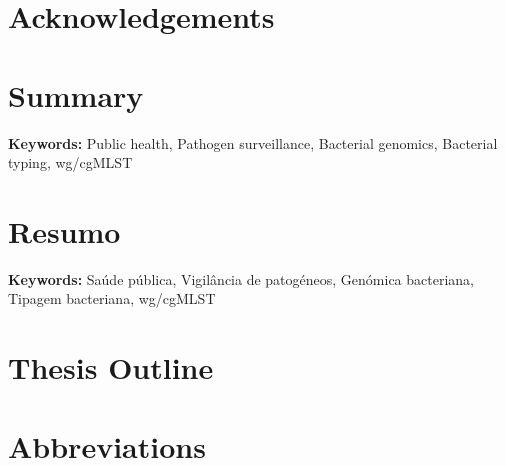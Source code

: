 \documentclass[12pt,a4paper,twoside,openright]{book}
\makeatletter
\def\cleardoublepage{\clearpage\if@twoside \ifodd\c@page\else
    \hbox{}
    \thispagestyle{plain}
    \newpage
    \if@twocolumn\hbox{}\newpage\fi\fi\fi}
\providecommand{\keywords}[1]{\textbf{Keywords:} #1}
\makeatother
\begin{document}
\begin{sloppy}
\chapter*{Acknowledgements}

\clearpage \thispagestyle{empty}\mbox{}\clearpage
\cleardoublepage

\newpage
\thispagestyle{plain}
\chapter*{Summary}


\keywords{Public health, Pathogen surveillance, Bacterial genomics, Bacterial typing, wg/cgMLST}
\clearpage \thispagestyle{empty}\mbox{}\clearpage
\cleardoublepage

\newpage
\thispagestyle{plain}
\chapter*{Resumo}


\keywords{Saúde pública, Vigilância de patogéneos, Genómica bacteriana, Tipagem bacteriana, wg/cgMLST}
\clearpage \thispagestyle{empty}\mbox{}\clearpage
\cleardoublepage

\newpage
\thispagestyle{plain}
\chapter*{Thesis Outline}

\clearpage \thispagestyle{empty}\mbox{}\clearpage
\cleardoublepage

\newpage
\thispagestyle{plain}
\chapter*{Abbreviations}

\clearpage \thispagestyle{empty}\mbox{}\clearpage
\cleardoublepage


\end{sloppy}
\end{document}
